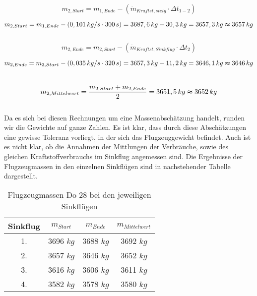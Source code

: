 \begin{equation*}
m_{2,Start} = m_{1,Ende} - (\dot{m}_{Kraftst,steig} \cdot \Delta t_{1-2})
\end{equation*}

\begin{equation*}
m_{2,Start} = m_{1,Ende} - (0,101 \, {kg/s} \cdot 300 \, {s}) = 3687,6 \, {kg} - 30,3 \, {kg} = 3657,3 \, {kg} \thickapprox 3657 \, {kg}
\end{equation*} \\

\begin{equation*}
m_{2,Ende} = m_{2,Start} - (\dot{m}_{Kraftst,Sinkflug} \cdot \Delta t_2)
\end{equation*}

\begin{equation*}
m_{2,Ende} = m_{2,Start} - (0,035 \, {kg/s} \cdot 320 \, {s}) = 3657,3 \, {kg} - 11,2 \, {kg} = 3646,1 \, {kg} \thickapprox 3646 \, {kg}
\end{equation*} \\

\begin{equation*}
m_{2,Mittelwert} = \frac{m_{2,Start} + m_{2,Ende}}{2} = 3651,5 \, {kg} \thickapprox 3652 \, {kg}
\end{equation*} \\

\noindent Da es sich bei diesen Rechnungen um eine Massenabschätzung handelt, runden wir die Gewichte auf ganze Zahlen. Es ist klar, dass durch diese Abschätzungen eine gewisse Toleranz vorliegt, in der sich das Flugzeuggewicht befindet. Auch ist es nicht klar, ob die Annahmen der Mittlungen der Verbräuche, sowie des gleichen Kraftstoffverbrauchs im Sinkflug angemessen sind. Die Ergebnisse der Flugzeugmassen in den einzelnen Sinkflügen sind in nachstehender Tabelle dargestellt.\\

\begin{table}[h]
	\centering
	\begin{tabular}{|c|c|c|c|}
		\hline
		\textbf{Sinkflug} & \textbf{$m_{Start}$} & \textbf{$m_{Ende}$} & \textbf{$m_{Mittelwert}$} \\ \hline
		1.	& 3696 $kg$	& 3688 $kg$ & 3692 $kg$    \\ \hline
		2.	& 3657 $kg$   & 3646 $kg$ & 3652 $kg$    \\ \hline
		3.	& 3616 $kg$	& 3606 $kg$ & 3611 $kg$	   \\ \hline
		4.  & 3582 $kg$	& 3578 $kg$ & 3580 $kg$    \\ \hline
	
		
		
	\end{tabular}
	\caption{Flugzeugmassen Do 28 bei den jeweiligen Sinkflügen}
\end{table}


\newpage